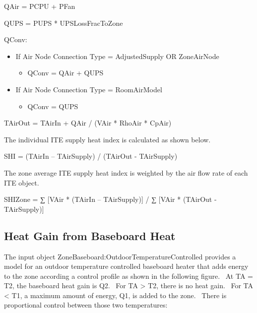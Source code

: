 QAir = PCPU + PFan

QUPS = PUPS * UPSLossFracToZone

QConv:

\begin{itemize}
    \tightlist
  \item
    If Air Node Connection Type = AdjustedSupply OR ZoneAirNode
    \begin{itemize}
      \item   QConv = QAir + QUPS
    \end{itemize}
  \item
    If Air Node Connection Type = RoomAirModel
    \begin{itemize}
      \item   QConv = QUPS
    \end{itemize}
\end{itemize}

TAirOut = TAirIn + QAir / (VAir * RhoAir * CpAir)

The individual ITE supply heat index is calculated as shown below.

SHI = (TAirIn -- TAirSupply) / (TAirOut - TAirSupply)

The zone average ITE supply heat index is weighted by the air flow rate of each ITE object.

SHIZone = ∑ {[}VAir * (TAirIn -- TAirSupply){]} / ∑ {[}VAir * (TAirOut - TAirSupply){]}

\subsection{Heat Gain from Baseboard Heat}\label{heat-gain-from-baseboard-heat}

The input object ZoneBaseboard:OutdoorTemperatureControlled provides a model for an outdoor temperature controlled baseboard heater that adds energy to the zone according a control profile as shown in the following figure.~ At TA = T2, the baseboard heat gain is Q2.~ For TA \textgreater{} T2, there is no heat gain.~ For TA \textless{} T1, a maximum amount of energy, Q1, is added to the zone.~ There is proportional control between those two temperatures:

